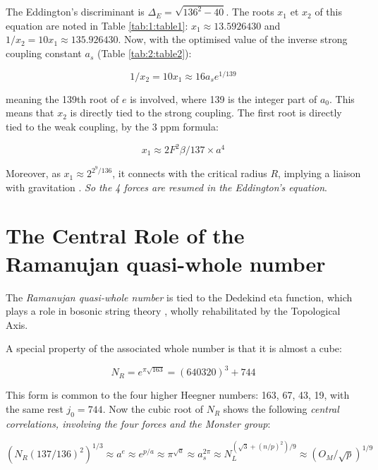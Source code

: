 \documentclass[a4paper,9pt]{article}
\begin{document}
The Eddington's discriminant is $\Delta_E = \sqrt{136^2-40}$. The roots $x_1$ et $x_2$ of this equation are noted in Table \ref{tab:1:table1}: $x_1 \approx 13.5926430$ and $1/x_2 = 10 x_1 \approx  135.926430$. Now, with the optimised value of the inverse strong coupling constant $a_s$ (Table \ref{tab:2:table2}):

\begin{equation}
 1/x_2 = 10 x_1 \approx 16 a_s e^{1/139}     
\end{equation}

meaning the 139th root of $e$ is involved, where 139 is the integer part of $a_0$. This means that $x_2$ is directly tied to the strong coupling. The first root is directly tied to the weak coupling, by the 3 ppm formula:

\begin{equation}
  x_1 \approx 2F^2 \beta /137\times a^4    
\end{equation}

Moreover, as $x_1 \approx 2^{2^9/136}$, it connects with the critical radius $R$, implying a liaison with gravitation \cite{Sanchez}. \textit{So the 4 forces are resumed in the Eddington's equation}.







\section{The Central Role of the Ramanujan quasi-whole number}

The \textit{Ramanujan quasi-whole number} is tied to the Dedekind eta function, which plays a role in bosonic string theory \cite{Apostol}\cite{Lovelace}, wholly rehabilitated by the Topological Axis.


A special property of the associated whole number is that it is almost a cube:

\begin{equation}
N_R = e^{\pi \sqrt{163}} = (640320)^3 + 744
\end{equation}

This form is common to the four higher Heegner numbers: 163, 67, 43, 19, with the same rest $j_0 = 744$. Now the cubic root of $N_R$ shows the following \textit {central correlations, involving the four forces and the Monster group}:

\begin{equation}
(N_R (137/136)^2)^{1/3} \approx a^e \approx e^{p/a} \approx \pi^{\sqrt a} \approx a_s^{2\pi} \approx N_L^{(\sqrt{3} +(n/p)^2)/9} \approx (O_M/\sqrt{p})^{1/9}
\end{equation}
\end{document}
